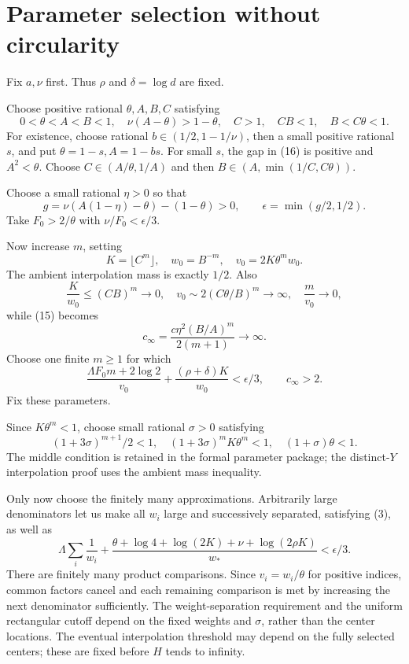 \section{Parameter selection without circularity}

Fix \(a,\nu\) first. Thus \(\rho\) and \(\delta=\log d\) are fixed.

Choose positive rational \(\theta,A,B,C\) satisfying
\[
0<\theta<A<B<1,\quad
\nu(A-\theta)>1-\theta,\quad
C>1,\quad CB<1,\quad B<C\theta<1.
\tag{16}
\]
For existence, choose rational \(b\in(1/2,1-1/\nu)\), then a small positive rational \(s\), and put \(\theta=1-s,A=1-bs\). For small \(s\), the gap in (16) is positive and \(A^2<\theta\). Choose \(C\in(A/\theta,1/A)\) and then \(B\in(A,\min(1/C,C\theta))\).

Choose a small rational \(\eta>0\) so that
\[
g=\nu(A(1-\eta)-\theta)-(1-\theta)>0,
\qquad \epsilon=\min(g/2,1/2).
\]
Take \(F_0>2/\theta\) with \(\nu/F_0<\epsilon/3\).

Now increase \(m\), setting
\[
K=\lfloor C^m\rfloor,\quad w_0=B^{-m},
\quad v_0=2K\theta^mw_0.
\]
The ambient interpolation mass is exactly \(1/2\). Also
\[
\frac K{w_0}\le(CB)^m\to0,\quad
v_0\sim2(C\theta/B)^m\to\infty,\quad
\frac m{v_0}\to0,
\]
while (15) becomes
\[
c_\infty=\frac{c\eta^2(B/A)^m}{2(m+1)}\to\infty.
\]
Choose one finite \(m\ge1\) for which
\[
\frac{\Lambda F_0m+2\log2}{v_0}
+\frac{(\rho+\delta)K}{w_0}<\epsilon/3,
\qquad c_\infty>2.
\tag{17}
\]
Fix these parameters.

Since \(K\theta^m<1\), choose small rational \(\sigma>0\) satisfying
\[
(1+3\sigma)^{m+1}/2<1,\quad
(1+3\sigma)^mK\theta^m<1,\quad
(1+\sigma)\theta<1.
\]
The middle condition is retained in the formal parameter package; the distinct-\(Y\) interpolation proof uses the ambient mass inequality.

Only now choose the finitely many approximations. Arbitrarily large denominators let us make all \(w_i\) large and successively separated, satisfying (3), as well as
\[
\Lambda\sum_i\frac1{w_i}
+\frac{\theta+\log4+\log(2K)+\nu+\log(2\rho K)}{w_*}
<\epsilon/3.
\tag{18}
\]
There are finitely many product comparisons. Since \(v_i=w_i/\theta\) for positive indices, common factors cancel and each remaining comparison is met by increasing the next denominator sufficiently. The weight-separation requirement and the uniform rectangular cutoff depend on the fixed weights and \(\sigma\), rather than the center locations. The eventual interpolation threshold may depend on the fully selected centers; these are fixed before \(H\) tends to infinity.


